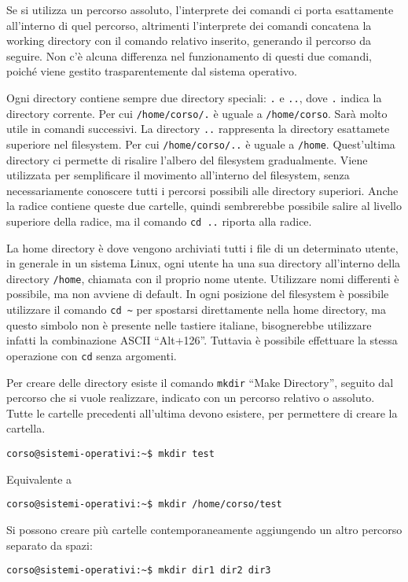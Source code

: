 \documentclass{article}
\numberwithin{equation}{subsection}
\begin{document}
Se si utilizza un percorso assoluto, l'interprete dei comandi ci porta esattamente all'interno di quel percorso, altrimenti l'interprete dei comandi concatena la working directory con il comando relativo inserito, 
generando il percorso da seguire. Non c'è alcuna differenza nel funzionamento di questi due comandi, poiché viene gestito trasparentemente dal sistema operativo. 

Ogni directory contiene sempre due directory speciali: \verb|.| e \verb|..|, dove \verb|.| indica la directory corrente. Per cui \verb|/home/corso/.| è uguale a \verb|/home/corso|. Sarà molto utile in comandi 
successivi. La directory \verb|..| rappresenta la directory esattamete superiore nel filesystem. Per cui \verb|/home/corso/..| è uguale a \verb|/home|. 
Quest'ultima directory ci permette di risalire l'albero del filesystem gradualmente. Viene utilizzata per semplificare il movimento all'interno del filesystem, senza necessariamente conoscere tutti i percorsi 
possibili alle directory superiori. Anche la radice contiene queste due cartelle, quindi sembrerebbe possibile salire al livello superiore della radice, ma il comando \verb|cd ..| riporta alla radice. 

La home directory è dove vengono archiviati tutti i file di un determinato utente, in generale in un sistema Linux, ogni utente ha una sua directory all'interno della directory \verb|/home|, chiamata con il proprio 
nome utente. Utilizzare nomi differenti è possibile, ma non avviene di default. In ogni posizione del filesystem è possibile utilizzare il comando \verb|cd ~| per spostarsi direttamente nella home directory, ma 
questo simbolo non è presente nelle tastiere italiane, bisognerebbe utilizzare infatti la combinazione ASCII ``Alt+126''. Tuttavia è possibile effettuare la stessa operazione con \verb|cd| senza argomenti. 

Per creare delle directory esiste il comando \verb|mkdir| ``Make Directory'', seguito dal percorso che si vuole realizzare, indicato con un percorso relativo o assoluto. Tutte le cartelle precedenti all'ultima 
devono esistere, per permettere di creare la cartella.  
\begin{verbatim}
corso@sistemi-operativi:~$ mkdir test
\end{verbatim}
Equivalente a 
\begin{verbatim}
corso@sistemi-operativi:~$ mkdir /home/corso/test
\end{verbatim}

Si possono creare più cartelle contemporaneamente aggiungendo un altro percorso separato da spazi:
\begin{verbatim}
corso@sistemi-operativi:~$ mkdir dir1 dir2 dir3
\end{verbatim}
\end{document}
